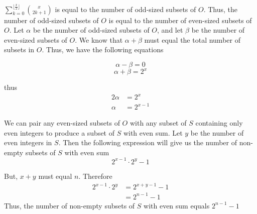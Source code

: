 \documentclass{article}
\begin{document}
\vspace{5mm}


$\sum_{k=0}^{\lfloor \frac{x}{2} \rfloor} \binom{x}{2k+1}$ is equal to the number of odd-sized subsets of $O$. Thus, the number of odd-sized subsets of $O$ is equal to the number of even-sized subsets of $O$. Let $\alpha$ be the number of odd-sized subsets of $O$, and let $\beta$ be the number of even-sized subsets of $O$. We know that $\alpha + \beta$ must equal the total number of subsets in $O$. Thus, we have the following equations

  \begin{equation}
  \alpha - \beta = 0
\end{equation} 
\begin{equation}
  \alpha + \beta = 2^{x}
\end{equation} 

\vspace{5mm}
thus
\begin{align*}
   2\alpha &= 2^{x}\\
   \alpha &= 2^{x-1}
  \end{align*}  

\vspace{5mm}
We can pair any even-sized subsets of $O$ with any subset of $S$ containing only even integers to produce a subset of $S$ with even sum. Let $y$ be the number of even integers in $S$. Then the following expression will give us the number of non-empty subsets of $S$ with even sum
  \begin{equation}
  2^{x-1}\cdot2^{y} - 1
\end{equation} 

But, $x + y$ must equal $n$. Therefore
\begin{align*}
2^{x-1}\cdot2^{y}&= 2^{x+y-1} - 1\\
&= 2^{n-1} - 1
  \end{align*}  
\vspace{5mm}
Thus, the number of non-empty subsets of $S$ with even sum equals $2^{n-1} -1$
  
\end{document}
